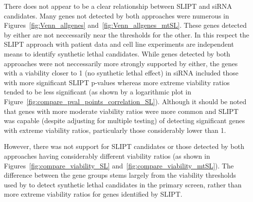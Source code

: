 There does not appear to be a clear relationship between \gls{SLIPT} and \gls{siRNA} candidates. Many genes not detected by both approaches were numerous in Figures~\ref{fig:Venn_allgenes} and~\ref{fig:Venn_allgenes_mtSL}. These genes detected by either are not neccessarily near the thresholds for the other. In this respect the \gls{SLIPT} approach with patient data and cell line experiments are independent means to identify synthetic lethal candidates. While genes detected by both approaches were not neccessarily more strongly supported by either, the genes with a viability closer to 1 (no synthetic lethal effect) in \gls{siRNA} included those with more significant \gls{SLIPT} p-values whereas more extreme viability ratios tended to be less significant (as shown by a logarithmic plot in Figure~\ref{fig:compare_pval_points_correlation_SL}). Although it should be noted that genes with more moderate viability ratios were more common and \gls{SLIPT} was capable (despite adjusting for multiple testing) of detecting significant genes with extreme viability ratios, particularly those considerably lower than 1. 

However, there was not support for \gls{SLIPT} candidates or those detected by both approaches having considerably different viability ratios (as shown in Figures~\ref{fig:compare_viability_SL} and~\ref{fig:compare_viability_mtSL}). The difference between the gene groups stems largely from the viability thresholds used by \citet{Telford2015} to detect synthetic lethal candidates in the primary screen, rather than more extreme viability ratios for genes identified by \gls{SLIPT}. 

